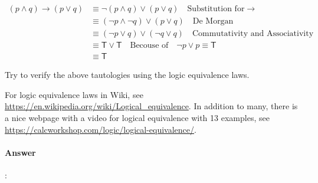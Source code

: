 \documentclass{article}
\begin{document}
\begin{equation*}
  \begin{aligned}
    (p \land q) \to (p \lor q) & \equiv \lnot (p \land q) \lor (p \lor q) \quad \text{Substitution for} \to \\
    & \equiv (\lnot p \land \lnot q) \lor (p \lor q) \quad \text{De Morgan} \\
    & \equiv (\lnot p \lor q) \lor (\lnot q \lor q) \quad \text{Commutativity and Associativity} \\
    & \equiv \mathsf{T} \lor \mathsf{T} \quad \text{Becouse of} \quad \lnot p \lor p \equiv \mathsf{T} \\
    & \equiv \mathsf{T}
  \end{aligned}
\end{equation*}

Try to verify the above tautologies using the logic equivalence laws.

\begin{tcolorbox}
  For logic equivalence laws in Wiki, see \url{https://en.wikipedia.org/wiki/Logical_equivalence}. In addition to many, there is a nice webpage with a video for logical equivalence with 13 examples, see \url{https://calcworkshop.com/logic/logical-equivalence/}.
\end{tcolorbox}

\paragraph{Answer}:
\end{document}

